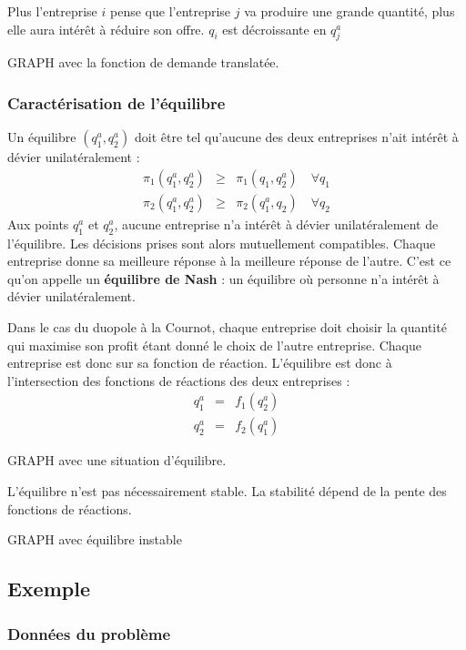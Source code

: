 \documentclass[
]{book}
\theoremstyle{definition}
\theoremstyle{definition}
\theoremstyle{definition}
\theoremstyle{definition}
\theoremstyle{remark}
\begin{document}
Plus l'entreprise \(i\) pense que l'entreprise \(j\) va produire une grande quantité, plus elle aura intérêt à réduire son offre.
\(q_i\) est décroissante en \(q_j^a\)

GRAPH avec la fonction de demande translatée.

\hypertarget{caractuxe9risation-de-luxe9quilibre}{%
\subsubsection{Caractérisation de l'équilibre}\label{caractuxe9risation-de-luxe9quilibre}}

Un équilibre \((q_1^a, q_2^a)\) doit être tel qu'aucune des deux entreprises n'ait intérêt à dévier unilatéralement :
\[
\begin{array}{rcl}
\pi_1(q_1^a, q_2^a) &\geq& \pi_1(q_1, q_2^a)\quad \forall q_1\\
\pi_2(q_1^a, q_2^a) &\geq& \pi_2(q_1^a, q_2)\quad \forall q_2
\end{array}
\]
Aux points \(q_1^a\) et \(q_2^a\), aucune entreprise n'a intérêt à dévier unilatéralement de l'équilibre.
Les décisions prises sont alors mutuellement compatibles.
Chaque entreprise donne sa meilleure réponse à la meilleure réponse de l'autre.
C'est ce qu'on appelle un \textbf{équilibre de Nash} : un équilibre où personne n'a intérêt à dévier unilatéralement.

Dans le cas du duopole à la Cournot, chaque entreprise doit choisir la quantité qui maximise son profit étant donné le choix de l'autre entreprise.
Chaque entreprise est donc sur sa fonction de réaction.
L'équilibre est donc à l'intersection des fonctions de réactions des deux entreprises :
\[
\begin{array}{rcl}
q_1^a&=&f_1(q_2^a)\\
q_2^a&=&f_2(q_1^a)
\end{array}
\]

GRAPH avec une situation d'équilibre.

L'équilibre n'est pas nécessairement stable.
La stabilité dépend de la pente des fonctions de réactions.

GRAPH avec équilibre instable

\hypertarget{exemple}{%
\subsection{Exemple}\label{exemple}}

\hypertarget{donnuxe9es-du-probluxe8me}{%
\subsubsection{Données du problème}\label{donnuxe9es-du-probluxe8me}}
\end{document}
